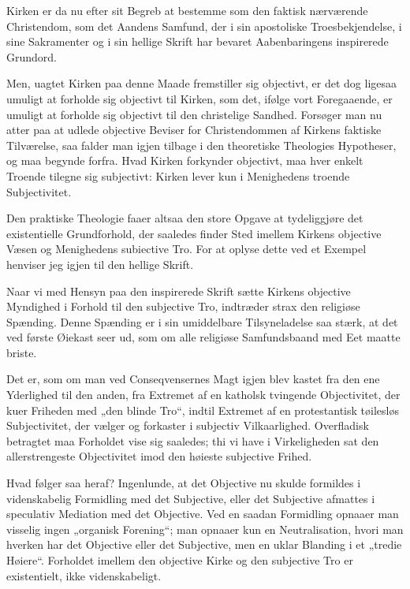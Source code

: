 \documentclass[12pt,a4paper]{book}
\newcommand{\opage}[1]{\marginnote{\footnotesize\textit{[#1]}}}
\begin{document}
\opage{153} Kirken er da nu efter sit Begreb at bestemme som den faktisk nærværende
Christendom, som det Aandens Samfund, der i sin apostoliske Troesbekjendelse, i
sine Sakramenter og i sin hellige Skrift har bevaret Aabenbaringens inspirerede
Grundord.

Men, uagtet Kirken paa denne Maade fremstiller sig objectivt, er det dog ligesaa
umuligt at forholde sig objectivt til Kirken, som det, ifølge vort Foregaaende,
er umuligt at forholde sig objectivt til den christelige Sandhed. Forsøger man
nu atter paa at udlede objective Beviser for Christendommen af Kirkens faktiske
Tilværelse, saa falder man igjen tilbage i den theoretiske Theologies
Hypotheser, og maa begynde forfra. Hvad Kirken forkynder objectivt, maa hver
enkelt Troende tilegne sig subjectivt: Kirken lever kun i Menighedens troende
Subjectivitet.

Den praktiske Theologie faaer altsaa den store Opgave at tydeliggjøre det
existentielle Grundforhold, der saaledes finder Sted imellem Kirkens objective
Væsen og Menighedens subiective Tro. For at oplyse dette ved et Exempel henviser
jeg igjen til den hellige Skrift.

Naar vi med Hensyn paa den inspirerede Skrift sætte Kirkens objective Myndighed
i Forhold til den subjective Tro, indtræder strax den religiøse Spænding. Denne
Spænding er i sin umiddelbare Tilsyneladelse saa stærk, at det ved første
Øiekast seer ud, som om alle religiøse Samfundsbaand med Eet maatte briste.

Det er, som om man ved Conseqvensernes Magt igjen blev kastet fra den ene
Yderlighed til den anden, fra Extremet af en katholsk tvingende Objectivitet,
der kuer Friheden med „den blinde Tro“, indtil Extremet af en protestantisk
tøilesløs Subjectivitet, der vælger og forkaster i subjectiv Vilkaarlighed.
Overfladisk betragtet maa Forholdet vise sig saaledes; thi vi have i
Virkeligheden sat den allerstrengeste Objectivitet imod den høieste subjective
Frihed.

\opage{154} Hvad følger saa heraf? Ingenlunde, at det Objective nu skulde formildes i
videnskabelig Formidling med det Subjective, eller det Subjective afmattes i
speculativ Mediation med det Objective. Ved en saadan Formidling opnaaer man
visselig ingen „organisk Forening“; man opnaaer kun en Neutralisation, hvori man
hverken har det Objective eller det Subjective, men en uklar Blanding i et
„tredie Høiere“. Forholdet imellem den objective Kirke og den subjective Tro er
existentielt, ikke videnskabeligt.
\end{document}
